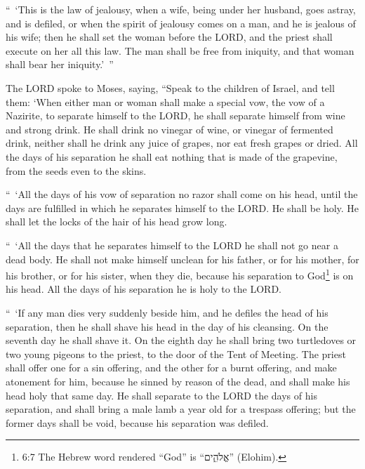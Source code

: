 \myverse{}“ ‘This is the law of jealousy, when a wife, being under her husband,
goes astray, and is defiled,
\myverse{}or when the spirit of jealousy comes on a man, and he is jealous of his wife;
then he shall set the woman before the LORD, and the priest shall execute on her all this law.
\myverse{}The man shall be free from iniquity, and that woman shall bear her iniquity.’ ”


\mychapter{} \myverse*{}The LORD spoke to Moses, saying,
\myverse{}“Speak to the children of Israel, and tell them: ‘When either man or woman shall
make a special vow, the vow of a Nazirite, to separate himself to the LORD,
\myverse{}he shall separate himself from wine and strong drink. He shall drink no vinegar
of wine, or vinegar of fermented drink, neither shall he drink any juice of grapes, nor eat fresh grapes
or dried.
\myverse{}All the days of his separation he shall eat nothing that is made of the grapevine,
from the seeds even to the skins.


\myverse{}“ ‘All the days of his vow of separation no razor shall come on
his head, until the days are fulfilled in which he separates himself to the LORD. He shall be holy. He
shall let the locks of the hair of his head grow long.


\myverse{}“ ‘All the days that he separates himself to the LORD he shall not
go near a dead body.
\myverse{}He shall not make himself unclean for his father, or for his mother, for his
brother, or for his sister, when they die, because his separation to God\footnote{ 6:7 The Hebrew word rendered “God” is “אֱלֹהִ֑ים” (Elohim).} is on his head.
\myverse{}All the days of his separation he is holy to the LORD.


\myverse{}“ ‘If any man dies very suddenly beside him, and he defiles the
head of his separation, then he shall shave his head in the day of his cleansing. On the seventh day he
shall shave it.
\myverse{}On the eighth day he shall bring two turtledoves or two young pigeons to the
priest, to the door of the Tent of Meeting.
\myverse{}The priest shall offer one for a sin offering, and the other for a burnt offering,
and make atonement for him, because he sinned by reason of the dead, and shall make his head holy that
same day.
\myverse{}He shall separate to the LORD the days of his separation, and shall bring
a male lamb a year old for a trespass offering; but the former days shall be void, because his separation
was defiled.


